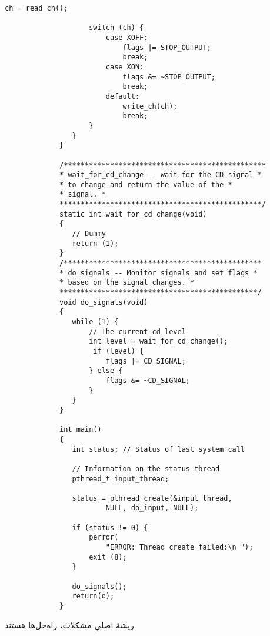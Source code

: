\begin{LTR}
\begin{lstlisting}[style=C++Style]
             		ch = read_ch();

             		switch (ch) {
             			case XOFF:
             				flags |= STOP_OUTPUT;
             				break;
             			case XON:
             				flags &= ~STOP_OUTPUT;
             				break;
             			default:
             				write_ch(ch);
             				break;
             		}
             	}
             }

             /************************************************
             * wait_for_cd_change -- wait for the CD signal *
             * to change and return the value of the *
             * signal. *
             ************************************************/
             static int wait_for_cd_change(void)
             {
             	// Dummy
             	return (1);
             }
             /***********************************************
             * do_signals -- Monitor signals and set flags *
             * based on the signal changes. *
             ***********************************************/
             void do_signals(void)
             {
             	while (1) {
             		// The current cd level
             		int level = wait_for_cd_change();
            		 if (level) {
             			flags |= CD_SIGNAL;
             		} else {
             			flags &= ~CD_SIGNAL;
             		}
             	}
             }

             int main()
             {
             	int status; // Status of last system call

             	// Information on the status thread
             	pthread_t input_thread;

             	status = pthread_create(&input_thread,
             			NULL, do_input, NULL);

             	if (status != 0) {
             		perror(
             			"ERROR: Thread create failed:\n ");
             		exit (8);
             	}

             	do_signals();
             	return(o);
             }
        \end{lstlisting}
\end{LTR}

\begin{tcolorbox}
    ریشهٔ اصلیِ مشکلات، راه‌حل‌ها هستند.
\end{tcolorbox}